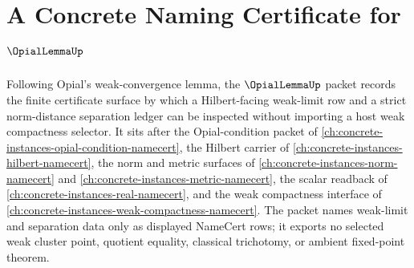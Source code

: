\chapter{A Concrete Naming Certificate for $\OpialLemmaUp$}
\label{ch:concrete-instances-opial-lemma-namecert}

Following Opial's weak-convergence lemma, the $\OpialLemmaUp$ packet records the finite certificate surface by which a Hilbert-facing weak-limit row and a strict norm-distance separation ledger can be inspected without importing a host weak compactness selector. It sits after the Opial-condition packet of \autoref{ch:concrete-instances-opial-condition-namecert}, the Hilbert carrier of \autoref{ch:concrete-instances-hilbert-namecert}, the norm and metric surfaces of \autoref{ch:concrete-instances-norm-namecert} and \autoref{ch:concrete-instances-metric-namecert}, the scalar readback of \autoref{ch:concrete-instances-real-namecert}, and the weak compactness interface of \autoref{ch:concrete-instances-weak-compactness-namecert}. The packet names weak-limit and separation data only as displayed NameCert rows; it exports no selected weak cluster point, quotient equality, classical trichotomy, or ambient fixed-point theorem.

